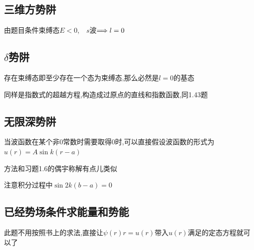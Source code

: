\documentclass{article}
\begin{document}
        \subsection{三维方势阱}
            由题目条件束缚态$E<0$,$\quad s$波$\Longrightarrow l = 0$

        \subsection{\texorpdfstring{$\delta$}{}势阱}
            存在束缚态即至少存在一个态为束缚态,那么必然是$l=0$的基态

            同样是指数式的超越方程,构造成过原点的直线和指数函数,同1.43题

        \subsection{无限深势阱}
            当波函数在某个非0常数时需要取得0时,可以直接假设波函数的形式为$u(r) = A \sin{k(r-a)}$

            方法和习题1.6的偶宇称解有点儿类似

            注意积分过程中$\sin{2k(b-a)} = 0$

        \subsection{已经势场条件求能量和势能}
            此题不用按照书上的求法,直接让$\psi(r)r = u(r) $带入$u(r)$满足的定态方程就可以了
\end{document}
